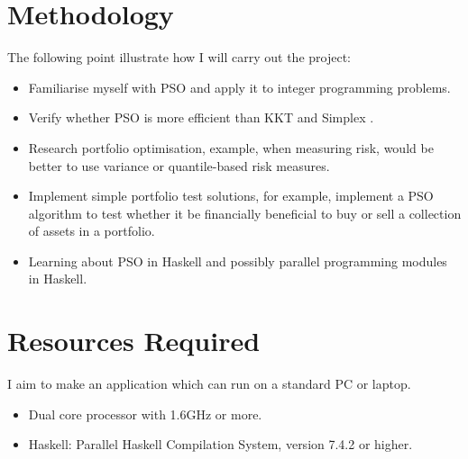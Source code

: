 \documentclass[a4paper,12pt]{article}
\begin{document}


\section*{Methodology}
The following point illustrate how I will carry out the project:
\begin{itemize}
  \item Familiarise myself with PSO and apply it to integer programming problems.
  \item Verify whether PSO is more efficient than KKT \cite{kkt} and Simplex \cite{simplex}.
  \item Research portfolio optimisation, example, when measuring risk, would be better to use variance or  quantile-based risk measures\cite{moea}.
  \item Implement simple portfolio test solutions, for example, implement a PSO algorithm to test whether it be financially beneficial to buy or sell a collection of assets in a portfolio\cite{pso2}. 
  \item Learning about PSO in Haskell and possibly parallel programming modules in Haskell.
\end{itemize}


\section*{Resources Required}
I aim to make an application which can run on a standard PC or laptop. 
\begin{itemize}
  \item Dual core processor with 1.6GHz or more.
  \item Haskell: Parallel Haskell Compilation System, version 7.4.2 or higher.
\end{itemize}
\end{document}
